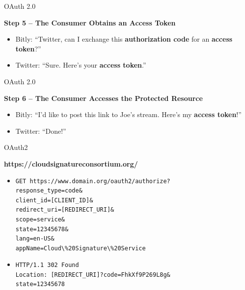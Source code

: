 \documentclass[pdf]{beamer}
\begin{document}
\begin{frame}{OAuth 2.0}

\textbf{Step 5 – The Consumer Obtains an Access Token}

\begin{itemize}
\item
Bitly: “Twitter, can I exchange this \textbf{authorization code} for an \textbf{access token}?”
\newline

\item
Twitter: “Sure.  Here’s your \textbf{access token}.”

\end{itemize}
\end{frame}



\begin{frame}{OAuth 2.0}

\textbf{Step 6 – The Consumer Accesses the Protected Resource}

\begin{itemize}
\item
Bitly: “I’d like to post this link to Joe’s stream.  Here’s my \textbf{access token}!”
\newline

\item
Twitter: “Done!”

\end{itemize}
\end{frame}



\begin{frame}[fragile]{OAuth2}

\textbf{https://cloudsignatureconsortium.org/}

\begin{itemize}
\item
\begin{verbatim}
GET https://www.domain.org/oauth2/authorize?
response_type=code&
client_id=[CLIENT_ID]&
redirect_uri=[REDIRECT_URI]&
scope=service&
state=12345678&
lang=en-US&
appName=Cloud\%20Signature\%20Service
\end{verbatim}

\item
\begin{verbatim}
HTTP/1.1 302 Found
Location: [REDIRECT_URI]?code=FhkXf9P269L8g&
state=12345678
\end{verbatim}
\end{itemize}
\end{frame}
\end{document}
